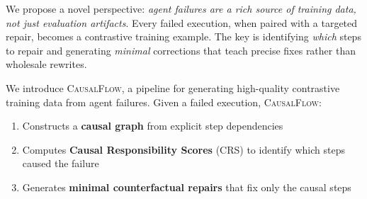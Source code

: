 \documentclass{article}
\theoremstyle{plain}
\theoremstyle{definition}
\theoremstyle{remark}
\begin{document}
We propose a novel perspective: \emph{agent failures are a rich source of training data, not just evaluation artifacts}. Every failed execution, when paired with a targeted repair, becomes a contrastive training example. The key is identifying \emph{which} steps to repair and generating \emph{minimal} corrections that teach precise fixes rather than wholesale rewrites.

We introduce \textsc{CausalFlow}, a pipeline for generating high-quality contrastive training data from agent failures. Given a failed execution, \textsc{CausalFlow}:
\begin{enumerate}
    \item Constructs a \textbf{causal graph} from explicit step dependencies
    \item Computes \textbf{Causal Responsibility Scores} (CRS) to identify which steps caused the failure
    \item Generates \textbf{minimal counterfactual repairs} that fix only the causal steps
\end{enumerate}
\end{document}
